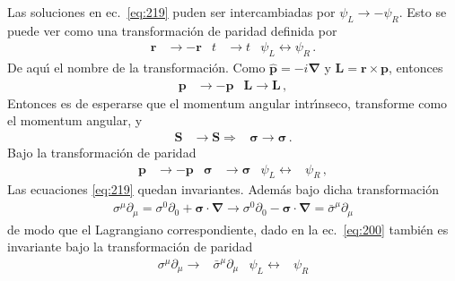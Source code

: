 \begin{subappendices}
Las soluciones en ec.~\eqref{eq:219} puden ser intercambiadas por $\psi_L\to -\psi_R$. Esto se puede ver como una transformaci\'on de paridad definida por
\begin{align}
  \mathbf{r}&\to-\mathbf{r}& t&\to t& \psi_L\leftrightarrow \psi_R\,.
\end{align}
De aqu\'\i{} el nombre de la transformaci\'on. Como $\hat{\mathbf{p}}=-i\boldsymbol{\nabla}$ y $\mathbf{L}=\mathbf{r}\times\mathbf{p}$, entonces
\begin{align}
  \mathbf{p}&\to-\mathbf{p}& \mathbf{L}\to\mathbf{L}\,,
\end{align}
Entonces es de esperarse que el momentum angular intr\'\i nseco, transforme como el momentum angular, y
\begin{align}
  \mathbf{S}&\to \mathbf{S}\Rightarrow& \boldsymbol{\sigma}\to\boldsymbol{\sigma}\,.
\end{align}
Bajo la transformaci\'on de paridad
\begin{align}
   \mathbf{p}&\to-\mathbf{p}& \boldsymbol{\sigma}&\to \boldsymbol{\sigma}& \psi_L\leftrightarrow &\psi_R\,,
\end{align}
Las ecuaciones \eqref{eq:219} quedan invariantes. Adem\'as bajo dicha transformaci\'on
\begin{align}
  \sigma^\mu\partial_\mu=\sigma^0\partial_0+\boldsymbol{\sigma}\cdot\boldsymbol{\nabla}\to \sigma^0\partial_0-\boldsymbol{\sigma}\cdot\boldsymbol{\nabla}=\bar{\sigma}^\mu\partial_\mu
\end{align}
de modo que el Lagrangiano correspondiente, dado en la ec.~\eqref{eq:200} tambi\'en es invariante bajo la transformaci\'on de paridad
\begin{align}
  \sigma^\mu\partial_\mu\to& \bar{\sigma}^\mu\partial_\mu &\psi_L\leftrightarrow &\psi_R
\end{align}


\end{subappendices}




\renewcommand{\labelenumi}{\theenumi} %

%
